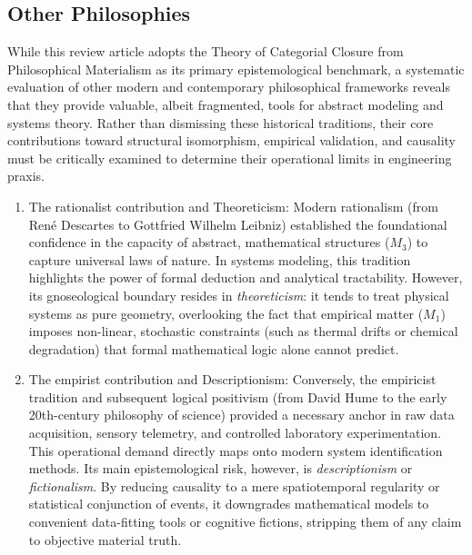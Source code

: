\documentclass[11pt, a4paper]{article}
\begin{document}
\subsection{Other Philosophies} \label{sec:other_philosophies}

While this review article adopts the Theory of Categorial Closure from Philosophical Materialism as its primary epistemological benchmark, a systematic evaluation of other modern and contemporary philosophical frameworks reveals that they provide valuable, albeit fragmented, tools for abstract modeling and systems theory. Rather than dismissing these historical traditions, their core contributions toward structural isomorphism, empirical validation, and causality must be critically examined to determine their operational limits in engineering praxis.


\begin{enumerate}
    \item {The rationalist contribution and Theoreticism:} Modern rationalism (from René Descartes to Gottfried Wilhelm Leibniz) established the foundational confidence in the capacity of abstract, mathematical structures ($M_3$) to capture universal laws of nature. In systems modeling, this tradition highlights the power of formal deduction and analytical tractability. However, its gnoseological boundary resides in \textit{theoreticism}: it tends to treat physical systems as pure geometry, overlooking the fact that empirical matter ($M_1$) imposes non-linear, stochastic constraints (such as thermal drifts or chemical degradation) that formal mathematical logic alone cannot predict.

    \item {The empirist contribution and Descriptionism:} Conversely, the empiricist tradition and subsequent logical positivism (from David Hume to the early 20th-century philosophy of science) provided a necessary anchor in raw data acquisition, sensory telemetry, and controlled laboratory experimentation. This operational demand directly maps onto modern system identification methods. Its main epistemological risk, however, is \textit{descriptionism} or \textit{fictionalism}. By reducing causality to a mere spatiotemporal regularity or statistical conjunction of events, it downgrades mathematical models to convenient data-fitting tools or cognitive fictions, stripping them of any claim to objective material truth.


\end{enumerate}
\end{document}
